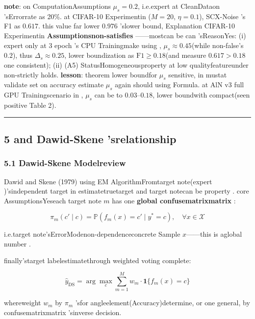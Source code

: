 \documentclass[
  12pt,
]{article}
\begin{document}
\textbf{note}: on ComputationAssumptions
\(\mu_s = 0.2\), i.e.expert at CleanDataon 'sErrorrate as  20\%. at  CIFAR-10
Experimentin (\(M=20\), \(\eta=0.1\)), SCX-Noise 's F1 as 
\(0.617\). this value far lower \(0.976\) 'slower bound, Explanation CIFAR-10
Experimentin \textbf{Assumptionsnon-satisfies }------mostcan be can 'sReasonYes: (i) expert only at  3 epoch 's
CPU Trainingmake using ,  \(\mu_s \approx 0.45\)(while non-false's \(0.2\)), thus
\(\Delta_s \approx 0.25\), lower boundization as  \(\text{F1} \geq 0.18\)(and measure
\(0.617 > 0.18\) one consistent); (ii) (A5)
StatusHomogeneousproperty at low qualityfeatureunder non-strictly holds. \textbf{lesson}: theorem lower boundfor  \(\mu_s\)
sensitive, in mustat validate set on accuracy estimate \(\mu_s\) again should using Formula. at  AlN v3
full GPU Trainingscenario in , \(\mu_s\) can be to 
\(0.03\text{--}0.18\), lower boundwith compact(seen positive Table 2). 

\begin{center}\rule{0.5\linewidth}{0.5pt}\end{center}

\subsection{5 and  Dawid-Skene
'srelationship }\label{ux4e0e-dawid-skene-ux7684ux5173ux7cfb}

\subsubsection{5.1 Dawid-Skene
Modelreview}\label{dawid-skene-ux6a21ux578bux56deux987e}

Dawid and  Skene (1979) using  EM
AlgorithmFromtarget note(expert )'sindependent target in estimatetruetarget and target notecan be property . core AssumptionsYeseach target note
\(m\) has one \textbf{global confusematrixmatrix }: 

\[\pi_m(c' \mid c) = \mathbb{P}(f_m(x) = c' \mid y^* = c), \quad \forall x \in \mathcal{X}\]

i.e.target note'sErrorModenon-dependenceconcrete Sample \(x\)------this is aglobal number . 

finally'starget labelestimatethrough weighted voting complete: 

\[\hat{y}_{\text{DS}} = \arg\max_c \sum_{m=1}^M w_m \cdot \mathbf{1}\{f_m(x) = c\}\]

whereweight \(w_m\) by  \(\pi_m\)
'sfor angleelement(Accuracy)determine, or one general, by confusematrixmatrix 'sinverse decision. 
\end{document}
